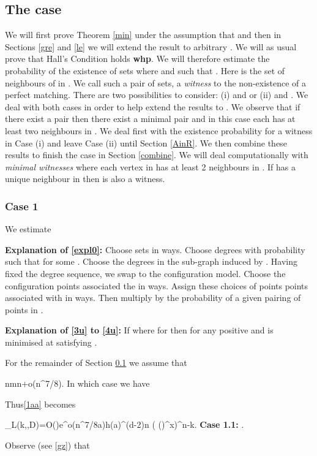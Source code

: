 \documentclass[11pt]{article}
\def\z{\zeta}
\def\p{\pi}
\def\whp{{\bf whp}}
\newcommand{\brac}[1]{\left(#1\right)}
\newcommand{\bfrac}[2]{\brac{\frac{#1}{#2}}}
\newcommand{\beq}[1]{}
\begin{document}
\subsection{The case }\label{m=n}
We will first prove Theorem \ref{min} under the assumption that  and then in Sections \ref{gre} and \ref{le} we will extend
the result to arbitrary . We will as usual prove that Hall's Condition holds \whp. We will therefore estimate the 
probability of the existence of sets  where  and  such that . Here  
is the set of neighbours of  in . We call such a pair of sets, a {\em witness} to the non-existence of a perfect matching.
There are two possibilities to consider: (i)  and  or
(ii)  and . We deal with both cases in order to help extend the results to . We observe
that if there exist a pair  then there exist a minimal pair and in this case each  has at least two neighbours in .
We deal first with the existence probability for a witness in Case (i) and leave Case (ii) until Section \ref{AinR}. We then 
combine these results to finish the case  in Section \ref{combine}. We will deal computationally with {\em minimal witnesses} 
where each vertex in  has at least 2 neighbours in . If  has a unique neighbour  in  then 
 is also a witness. 
\subsubsection{Case 1}\label{Case1}
We estimate


{\bf Explanation of \eqref{expl0}:}
Choose sets  in   ways. Choose degrees  with probability 
 such that  for some .
Choose the degrees  in the sub-graph induced by . Having fixed the degree sequence,
we swap to the configuration model. Choose the configuration points associated
the  in  ways. Assign these  choices of points points associated with  in  ways.
Then multiply by the probability  of a given pairing of points in .

{\bf Explanation of \eqref{3u} to \eqref{4u}:} If  where  for  
then  for any positive  and  is minimised at  satisfying 
.



For the remainder of Section \ref{m=n} we assume that 
\beq{46a}
n\leq m\leq n+o(n^{7/8}).
\eeq
In which case we have


Thus\eqref{1aa} becomes
\beq{1a}
\p_L(k,\ell,D)=O\bfrac{1}{n^{1/2}}e^{o(n^{7/8}a)}h(a)^{(d-2)n}
\brac{\frac{f(\z_1)}{\z_1^{d-x}}
\bfrac{e\frac{a}{1-a}}{x}^x}^{n-k}.
\eeq
{\bf Case 1.1:} .

Observe (see \eqref{gz}) that
\end{document}
